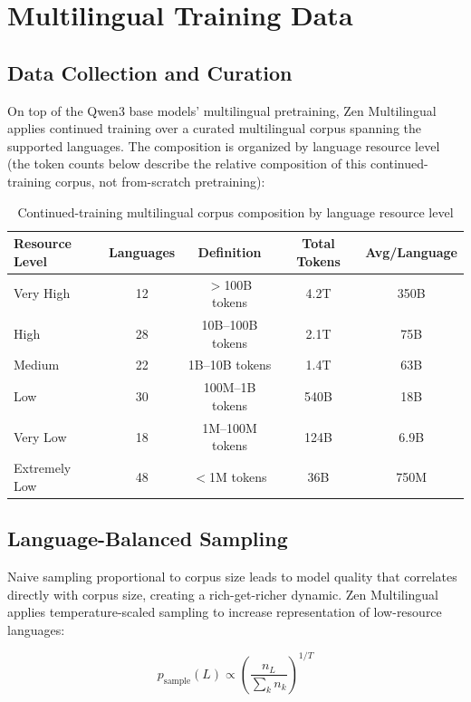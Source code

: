 \documentclass[11pt,a4paper]{article}
\begin{document}
\section{Multilingual Training Data}

\subsection{Data Collection and Curation}

On top of the Qwen3 base models' multilingual pretraining, Zen Multilingual applies
continued training over a curated multilingual corpus spanning the supported languages.
The composition is organized by language resource level (the token counts below describe
the relative composition of this continued-training corpus, not from-scratch pretraining):

\begin{table}[H]
\centering
\caption{Continued-training multilingual corpus composition by language resource level}
\label{tab:data}
\begin{tabular}{lcccc}
\toprule
Resource Level & Languages & Definition & Total Tokens & Avg/Language \\
\midrule
Very High & 12 & $>$100B tokens & 4.2T & 350B \\
High & 28 & 10B--100B tokens & 2.1T & 75B \\
Medium & 22 & 1B--10B tokens & 1.4T & 63B \\
Low & 30 & 100M--1B tokens & 540B & 18B \\
Very Low & 18 & 1M--100M tokens & 124B & 6.9B \\
Extremely Low & 48 & $<$1M tokens & 36B & 750M \\
\bottomrule
\end{tabular}
\end{table}

\subsection{Language-Balanced Sampling}

Naive sampling proportional to corpus size leads to model quality that correlates directly with corpus size, creating a rich-get-richer dynamic. Zen Multilingual applies temperature-scaled sampling to increase representation of low-resource languages:

\begin{equation}
p_{\text{sample}}(L) \propto \left(\frac{n_L}{\sum_k n_k}\right)^{1/T}
\end{equation}
\end{document}

